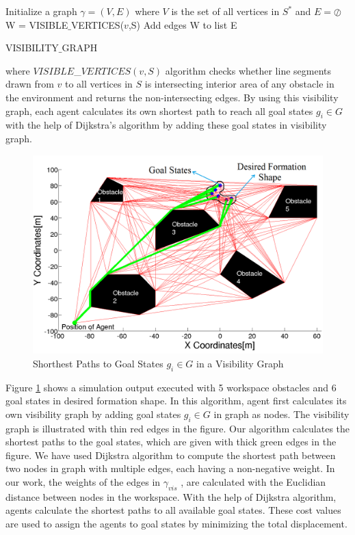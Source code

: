 \documentclass[letterpaper, 10 pt, conference]{ieeeconf}  %
\begin{document}
\begin{algorithm}
Initialize a graph $\gamma = (V,E)$ where $V$ is the set of all vertices in $S^*$ and $E = \oslash$  \\

{	
W = VISIBLE$\_$VERTICES($v$,S)\;
Add edges W to list E\;
}\

\caption{VISIBILITY$\_$GRAPH}

\end{algorithm}

where $VISIBLE$\_$VERTICES(v,S)$ algorithm checks whether line segments drawn from $v$ to all vertices in $S$ is intersecting interior area of any obstacle in the environment and returns the non-intersecting edges.  By using this visibility graph, each agent calculates its own shortest path to reach all goal states $g_i \in G$ with the help of Dijkstra's algorithm by adding these goal states in visibility graph.
	
 
\begin{figure}[thpb]
\centering
\includegraphics[scale = 0.22]{visgraph_yedek}
\caption{Shorthest Paths to Goal States $g_i \in G$ in a Visibility Graph} \label{dijksttae_visibility}
\end{figure}

Figure \ref{dijksttae_visibility} shows a simulation output executed with 5 workspace obstacles and 6 goal states in desired formation shape. In this algorithm, agent first calculates its own visibility graph by adding goal states $g_i \in G$ in graph as nodes. The visibility graph is illustrated with thin red edges in the figure. Our algorithm calculates the shortest paths to the goal states, which are given with thick green edges in the figure. We have used Dijkstra algorithm to compute the shortest path between two nodes in graph with multiple edges, each having a non-negative weight. In our work, the weights of the edges in $\gamma_{vis}$ , are calculated with the Euclidian distance between nodes in the workspace. With the help of Dijkstra algorithm, agents calculate the shortest paths to all available goal states. These cost values are used to assign the agents to goal states by minimizing the total displacement.  
\end{document}
